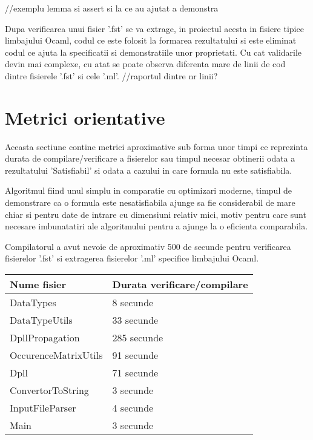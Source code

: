 {//exemplu lemma si assert si la ce au ajutat a demonstra

Dupa verificarea unui fisier '.fst' se va extrage, in proiectul acesta in fisiere tipice limbajului Ocaml, codul ce este folosit la formarea rezultatului si este eliminat codul ce ajuta la specificatii si demonstratiile unor proprietati. Cu cat validarile devin mai complexe, cu atat se poate observa diferenta mare de linii de cod dintre fisierele '.fst' si cele '.ml'.
//raportul dintre nr linii?

\section{Metrici orientative}

Aceasta sectiune contine metrici aproximative sub forma unor timpi ce reprezinta durata de compilare/verificare a fisierelor sau timpul necesar obtinerii odata a rezultatului 'Satisfiabil' si odata a cazului in care formula nu este satisfiabila.


Algoritmul fiind unul simplu in comparatie cu optimizari moderne, timpul de demonstrare ca o formula este nesatisfiabila ajunge sa fie considerabil de mare chiar si pentru date de intrare cu dimensiuni relativ mici, motiv pentru care sunt necesare imbunatatiri ale algoritmului pentru a ajunge la o eficienta comparabila.

Compilatorul a avut nevoie de aproximativ 500 de secunde pentru verificarea fisierelor '.fst' si extragerea fisierelor '.ml' specifice limbajului Ocaml. 
\newline

\begin{tabular}{|l|l|} \hline
	Nume fisier & Durata verificare/compilare \\\hline
	DataTypes & 8 secunde \\\hline
	DataTypeUtils & 33 secunde \\\hline
	DpllPropagation & 285 secunde \\\hline
	OccurenceMatrixUtils & 91 secunde \\\hline
	Dpll & 71 secunde \\\hline
	ConvertorToString & 3 secunde \\\hline
	InputFileParser & 4 secunde \\\hline
	Main & 3 secunde \\\hline	
\end{tabular}
\newline\newline

}
